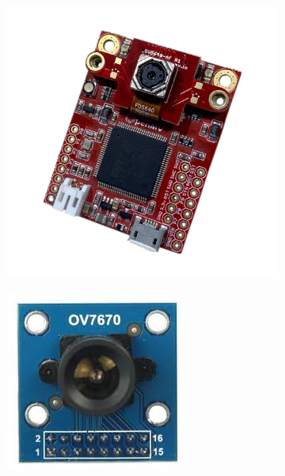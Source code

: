 \begin{figure}[h!]
	\centering
	\begin{subfigure}[b]{0.3\textwidth}
		\centering
		\includegraphics[width=\linewidth]{assets/ch2/OV5640}
		\caption{}
		\label{fig:ov5640}
	\end{subfigure}
	\hfill
	\begin{subfigure}[b]{0.3\textwidth}
		\centering
		\includegraphics[width=\linewidth]{assets/ch2/OV7670}

\end{subfigure}
\end{figure}
